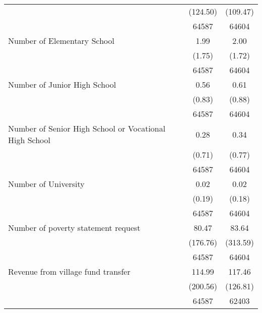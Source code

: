 \begin{tabular}{l*{2}{c}}
                    &    (124.50)&    (109.47)\\
                    &       64587&       64604\\
[1em]
Number of Elementary School&        1.99&        2.00\\
                    &      (1.75)&      (1.72)\\
                    &       64587&       64604\\
[1em]
Number of Junior High School&        0.56&        0.61\\
                    &      (0.83)&      (0.88)\\
                    &       64587&       64604\\
[1em]
Number of Senior High School or Vocational High School&        0.28&        0.34\\
                    &      (0.71)&      (0.77)\\
                    &       64587&       64604\\
[1em]
Number of University&        0.02&        0.02\\
                    &      (0.19)&      (0.18)\\
                    &       64587&       64604\\
[1em]
Number of poverty statement request&       80.47&       83.64\\
                    &    (176.76)&    (313.59)\\
                    &       64587&       64604\\
[1em]
Revenue from village fund transfer&      114.99&      117.46\\
                    &    (200.56)&    (126.81)\\
                    &       64587&       62403\\
\hline\hline
\end{tabular}
